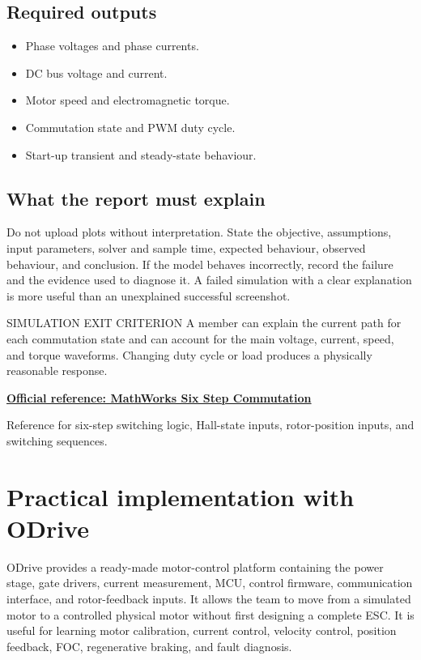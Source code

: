 \documentclass[11pt,a4paper]{article}
\newcommand{\Resource}[3]{%
  \begin{resourcebox}
    \href{#2}{\textbf{\color{DARESTeal}#1}}\par
    {\small #3}
  \end{resourcebox}
}
\begin{document}
\subsection{Required outputs}

\begin{itemize}
  \item Phase voltages and phase currents.
  \item DC bus voltage and current.
  \item Motor speed and electromagnetic torque.
  \item Commutation state and PWM duty cycle.
  \item Start-up transient and steady-state behaviour.
\end{itemize}

\subsection{What the report must explain}

Do not upload plots without interpretation. State the objective, assumptions,
input parameters, solver and sample time, expected behaviour, observed
behaviour, and conclusion. If the model behaves incorrectly, record the
failure and the evidence used to diagnose it. A failed simulation with a
clear explanation is more useful than an unexplained successful screenshot.

\begin{callout}{SIMULATION EXIT CRITERION}
  A member can explain the current path for each commutation state and can
  account for the main voltage, current, speed, and torque waveforms. Changing
  duty cycle or load produces a physically reasonable response.
\end{callout}

\Resource
  {Official reference: MathWorks Six Step Commutation}
  {https://www.mathworks.com/help/mcb/ref/sixstepcommutation.html}
  {Reference for six-step switching logic, Hall-state inputs, rotor-position inputs, and switching sequences.}

\section{Practical implementation with ODrive}

ODrive provides a ready-made motor-control platform containing the power
stage, gate drivers, current measurement, MCU, control firmware,
communication interface, and rotor-feedback inputs. It allows the team to
move from a simulated motor to a controlled physical motor without first
designing a complete ESC. It is useful for learning motor calibration,
current control, velocity control, position feedback, FOC, regenerative
braking, and fault diagnosis.
\end{document}
